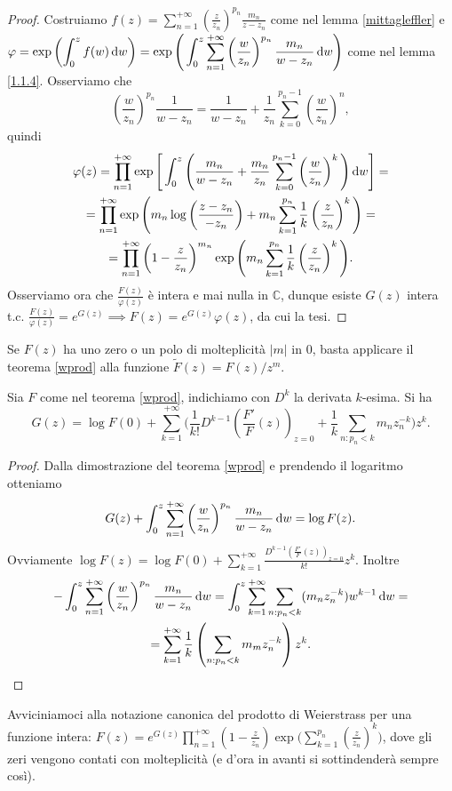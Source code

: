 \begin{proof}
  Costruiamo $\displaystyle f(z)=\sum_{n=1}^{+\infty} \left(\frac{z}{z_n}\right)^{p_n}\frac{m_n}{z-z_n}$ come nel lemma \ref{mittagleffler} e $\displaystyle \varphi=\exp\left(\int_0^z f(w)\mathop{}\!\mathrm{d} w\right)=\exp\Bigg(\int_0^z \sum_{n=1}^{+\infty}\left(\frac{w}{z_n}\right)^{p_n}\frac{m_n}{w-z_n}\mathop{}\!\mathrm{d} w\Bigg)$ come nel lemma \ref{1.1.4}.
  Osserviamo che
  $$\left(\frac{w}{z_n}\right)^{p_n}\frac{1}{w-z_n}=\frac{1}{w-z_n}+\frac{1}{z_n}\sum_{k=0}^{p_n-1}\left(\frac{w}{z_n}\right)^n,$$
  quindi
  \begin{gather*}
    \varphi(z)=\prod_{n=1}^{+\infty} \exp\Bigg[\int_0^z\Bigg(\frac{m_n}{w-z_n}+\frac{m_n}{z_n}\sum_{k=0}^{p_n-1}\left(\frac{w}{z_n}\right)^k\Bigg)\mathop{}\!\mathrm{d} w\Bigg]= \\
    =\prod_{n=1}^{+\infty}\exp\Bigg(m_n\log\left(\frac{z-z_n}{-z_n}\right)+m_n\sum_{k=1}^{p_n}\frac{1}{k}\left(\frac{z}{z_n}\right)^k\Bigg)= \\
    =\prod_{n=1}^{+\infty} \left(1-\frac{z}{z_n}\right)^{m_n}\exp\Bigg(m_n\sum_{k=1}^{p_n}\frac{1}{k}\left(\frac{z}{z_n}\right)^k\Bigg).
  \end{gather*}
  Osserviamo ora che $\frac{F(z)}{\varphi(z)}$ è intera e mai nulla in $\mathbb{C}$, dunque esiste $G(z)$ intera t.c. $\frac{F(z)}{\varphi(z)}=e^{G(z)} \implies F(z)=e^{G(z)}\varphi(z)$, da cui la tesi.
\end{proof}

\begin{oss}
  Se $F(z)$ ha uno zero o un polo di molteplicità $|m|$ in $0$, basta applicare il teorema \ref{wprod} alla funzione $\tilde{F}(z)=F(z)/z^m$.
\end{oss}

\begin{cor}
  Sia $F$ come nel teorema \ref{wprod}, indichiamo con $D^k$ la derivata $k$-esima. Si ha
  $$G(z)=\log{F(0)}+\sum_{k=1}^{+\infty}\Bigg(\frac{1}{k!}D^{k-1}\left(\frac{F'}{F}(z)\right)_{z=0}+\frac{1}{k}\sum_{n:p_n<k}m_nz_n^{-k}\Bigg)z^k.$$
\end{cor}

\begin{proof}
  Dalla dimostrazione del teorema \ref{wprod} e prendendo il logaritmo otteniamo
  $$G(z)+\int_0^z\sum_{n=1}^{+\infty}\left(\frac{w}{z_n}\right)^{p_n}\frac{m_n}{w-z_n}\mathop{}\!\mathrm{d} w=\log{F(z)}.$$
  Ovviamente $\displaystyle \log{F(z)}=\log{F(0)}+\sum_{k=1}^{+\infty} \frac{D^{k-1}\left(\frac{F'}{F}(z)\right)_{z=0}}{k!}z^k$. Inoltre
  \begin{gather*}
    -\int_0^z \sum_{n=1}^{+\infty} \left(\frac{w}{z_n}\right)^{p_n}\frac{m_n}{w-z_n}\mathop{}\!\mathrm{d} w=\int_0^z \sum_{k=1}^{+\infty} \sum_{n: p_n<k} (m_nz_n^{-k})w^{k-1}\mathop{}\!\mathrm{d} w= \\
    =\sum_{k=1}^{+\infty} \frac{1}{k}\left(\sum_{n: p_n<k}m_mz_n^{-k}\right)z^k.
  \end{gather*}
\end{proof}

Avviciniamoci alla notazione canonica del prodotto di Weierstrass per una funzione intera: $\displaystyle F(z)=e^{G(z)}\prod_{n=1}^{+\infty}\left(1-\frac{z}{z_n}\right)\exp\Bigg(\sum_{k=1}^{p_n}\left(\frac{z}{z_n}\right)^k\Bigg)$, dove gli zeri vengono contati con molteplicità (e d'ora in avanti si sottindenderà sempre così).
